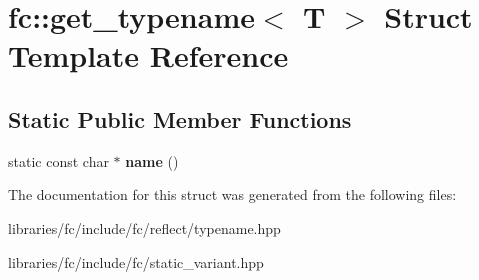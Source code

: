 \hypertarget{structfc_1_1get__typename}{}\section{fc\+:\+:get\+\_\+typename$<$ T $>$ Struct Template Reference}
\label{structfc_1_1get__typename}
\subsection*{Static Public Member Functions}
\begin{DoxyCompactItemize}
\item 
\mbox{\label{structfc_1_1get__typename_a91bf17305fe0e33370964086ca2e6ad0}} 
static const char $\ast$ {\bfseries name} ()
\end{DoxyCompactItemize}


The documentation for this struct was generated from the following files\+:\begin{DoxyCompactItemize}
\item 
libraries/fc/include/fc/reflect/typename.\+hpp\item 
libraries/fc/include/fc/static\+\_\+variant.\+hpp\end{DoxyCompactItemize}
